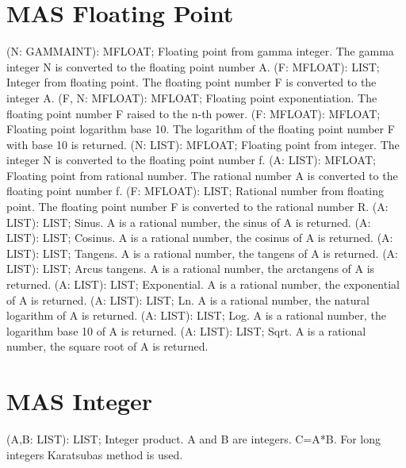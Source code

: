 \section{ MAS Floating Point  } 
 (N: GAMMAINT): MFLOAT; \eproc
\bcom Floating point from gamma integer.
The gamma integer N is converted to the floating point number A.  \ecom 
{} (F: MFLOAT): LIST; \eproc
\bcom Integer from floating point.
The floating point number F is converted to the integer A.  \ecom 
{} (F, N: MFLOAT): MFLOAT; \eproc
\bcom Floating point exponentiation.
The floating point number F raised to the n-th power.  \ecom 
{} (F: MFLOAT): MFLOAT; \eproc
\bcom Floating point logarithm base 10.
The logarithm of the floating point number F with base 10 is returned.  \ecom 
{} (N: LIST): MFLOAT; \eproc
\bcom Floating point from integer.
The integer N is converted to the floating point number f.  \ecom 
{} (A: LIST): MFLOAT; \eproc
\bcom Floating point from rational number.
The rational number A is converted to the floating point number f.  \ecom 
{} (F: MFLOAT): LIST; \eproc
\bcom Rational number from floating point.
The floating point number F is converted to the rational number R.  \ecom 
{} (A: LIST): LIST; \eproc
\bcom Sinus. A is a rational number, the sinus of A is returned.  \ecom 
{} (A: LIST): LIST; \eproc
\bcom Cosinus. A is a rational number, the cosinus of A is returned.  \ecom 
{} (A: LIST): LIST; \eproc
\bcom Tangens. A is a rational number, the tangens of A is returned.  \ecom 
{} (A: LIST): LIST; \eproc
\bcom Arcus tangens. A is a rational number, the arctangens of A is returned.  \ecom 
{} (A: LIST): LIST; \eproc
\bcom Exponential. A is a rational number, the exponential of A is returned.  \ecom 
{} (A: LIST): LIST; \eproc
\bcom Ln. A is a rational number, the natural logarithm of A is returned.  \ecom 
{} (A: LIST): LIST; \eproc
\bcom Log. A is a rational number, the logarithm base 10 of A is returned.  \ecom 
{} (A: LIST): LIST; \eproc
\bcom Sqrt. A is a rational number, the square root of A is returned.  \ecom 
\section{ MAS Integer  } 
 (A,B: LIST): LIST; \eproc
\bcom Integer product. A and B are integers. C=A*B. For long
integers Karatsubas method is used.  \ecom 
